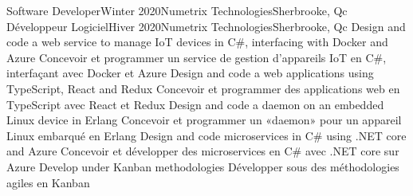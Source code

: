     \resumeSubheadingEnFr
        {Software Developer}{Winter 2020}{Numetrix Technologies}{Sherbrooke, Qc}
        {Développeur Logiciel}{Hiver 2020}{Numetrix Technologies}{Sherbrooke, Qc}
            \resumeItemListStart
                \resumeItemEnFr
                    {Design and code a web service to manage IoT devices in C\#, interfacing with Docker and Azure}
                    {Concevoir et programmer un service de gestion d’appareils IoT en C\#, interfaçant avec Docker et Azure}
                \resumeItemEnFr
                    {Design and code a web applications using TypeScript, React and Redux}
                    {Concevoir et programmer des applications web en TypeScript avec React et Redux}
                \resumeItemEnFr
                    {Design and code a daemon on an embedded Linux device in Erlang}
                    {Concevoir et programmer un «daemon» pour un appareil Linux embarqué en Erlang}
                \resumeItemEnFr
                    {Design and code microservices in C\# using .NET core and Azure}
                    {Concevoir et développer des microservices en C\# avec .NET core sur Azure}
                \resumeItemEnFr
                    {Develop under Kanban methodologies}
                    {Développer sous des méthodologies agiles en Kanban}
            \resumeItemListEnd

